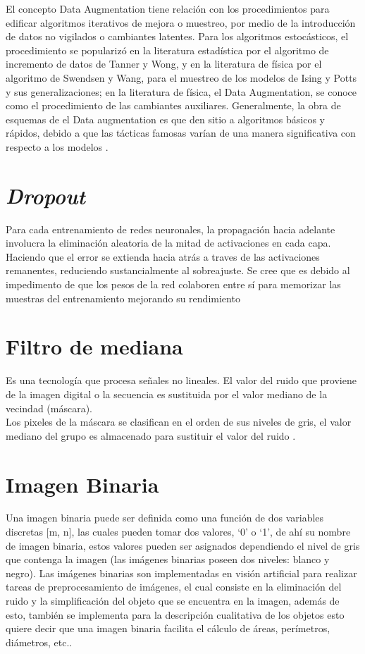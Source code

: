El concepto Data Augmentation tiene relación con los procedimientos para edificar algoritmos iterativos de mejora o muestreo, por medio de la introducción de datos no vigilados o cambiantes latentes. Para los algoritmos estocásticos, el procedimiento se popularizó en la literatura estadística por el algoritmo de incremento de datos de Tanner y Wong, y en la literatura de física por el algoritmo de Swendsen y Wang, para el muestreo de los modelos de Ising y Potts y sus generalizaciones; en la literatura de física, el Data Augmentation, se conoce como el procedimiento de las cambiantes auxiliares. Generalmente, la obra de esquemas de el Data augmentation es que den sitio a algoritmos básicos y rápidos, debido a que las tácticas famosas varían de una manera significativa con respecto a los modelos \cite{van2001art}.

\section{\textit{Dropout}}

Para cada entrenamiento de redes neuronales, la propagación hacia adelante involucra la eliminación aleatoria de la mitad de activaciones en cada capa. Haciendo que el error se extienda hacia atrás a traves de las activaciones remanentes, reduciendo sustancialmente al sobreajuste. Se cree que es debido al impedimento de que los pesos de la red colaboren entre sí para memorizar las muestras del entrenamiento mejorando su rendimiento \cite{hinton2012improving}

\section{Filtro de mediana}

Es una tecnología que procesa señales no lineales. El valor del ruido que proviene de la imagen digital o la secuencia es sustituida por el valor mediano de la vecindad (máscara).\\
Los pixeles de la máscara se clasifican en el orden de sus niveles de gris, el valor mediano del grupo es almacenado para sustituir el valor del ruido \cite{zhu2012improved}.

\section{Imagen Binaria} Una imagen binaria puede ser definida como una función de dos variables discretas
[m, n], las cuales pueden tomar dos valores, ‘0’ o ‘1’, de ahí su nombre de imagen binaria, estos valores pueden ser asignados dependiendo el nivel de gris que contenga la imagen (las imágenes binarias poseen dos niveles: blanco y negro). Las imágenes binarias son implementadas en visión artificial para realizar tareas de preprocesamiento de imágenes, el cual consiste en la eliminación del ruido y la simplificación del objeto que se encuentra en la imagen, además de esto, también se implementa para la descripción cualitativa de los objetos esto quiere decir que una imagen binaria facilita el cálculo de áreas, perímetros, diámetros, etc.\cite{ref_12}.

